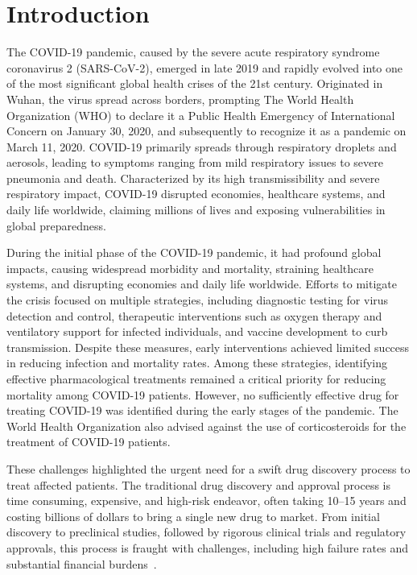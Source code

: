 \section{Introduction}
\label{chap:Introduction}

The COVID-19 pandemic, caused by the severe acute respiratory syndrome coronavirus 2 (SARS-CoV-2), emerged in late 2019 and rapidly evolved into one of the most significant global health crises of the 21st century. Originated in Wuhan, the virus spread across borders, prompting The World Health Organization (WHO) to declare it a Public Health Emergency of International Concern on January 30, 2020, and subsequently to recognize it as a pandemic on March 11, 2020. 
COVID-19 primarily spreads through respiratory droplets and aerosols, leading to symptoms ranging from mild respiratory issues to severe pneumonia and death. 
Characterized by its high transmissibility and severe respiratory impact, COVID-19 disrupted economies, healthcare systems, and daily life worldwide, claiming millions of lives and exposing vulnerabilities in global preparedness.

During the initial phase of the COVID-19 pandemic, it had profound global impacts, causing widespread morbidity and mortality, straining healthcare systems, and disrupting economies and daily life worldwide. Efforts to mitigate the crisis focused on multiple strategies, including diagnostic testing for virus detection and control, therapeutic interventions such as oxygen therapy and ventilatory support for infected individuals, and vaccine development to curb transmission. Despite these measures, early interventions achieved limited success in reducing infection and mortality rates. Among these strategies, identifying effective pharmacological treatments remained a critical priority for reducing mortality among COVID-19 patients. However, no sufficiently effective drug for treating COVID-19 was identified during the early stages of the pandemic. The World Health Organization also advised against the use of corticosteroids for the treatment of COVID-19 patients.

These challenges highlighted the urgent need for a swift drug discovery process to treat affected patients. %
The traditional drug discovery and approval process is time consuming, expensive, and high-risk endeavor, often taking 10–15 years and costing billions of dollars to bring a single new drug to market. From initial discovery to preclinical studies, followed by rigorous clinical trials and regulatory approvals, this process is fraught with challenges, including high failure rates and substantial financial burdens~\cite{adams2006estimating, dickson2009cost, dimasi2003price}.

